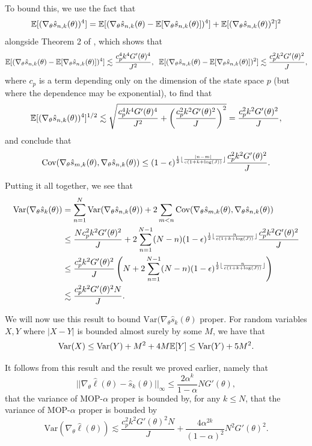 \documentclass{article}
\begin{document}
To bound this, we use the fact that $$\mathbb{E}[(\nabla_\theta\hat s_{n,k}(\theta))^4] = \mathbb{E}[(\nabla_\theta\hat s_{n,k}(\theta)-\mathbb{E}[\nabla_\theta\hat s_{n,k}(\theta)])^4]+\mathbb{E}[(\nabla_\theta\hat s_{n,k}(\theta))^2]^2$$
alongside Theorem 2 of \cite{delMoral03}, which shows that
$$\mathbb{E}[(\nabla_\theta\hat s_{n,k}(\theta)-\mathbb{E}[\nabla_\theta\hat s_{n,k}(\theta)])^4] \lesssim \frac{c_p^4k^4G'(\theta)^4}{J^2}, \;\; \mathbb{E}[(\nabla_\theta\hat s_{n,k}(\theta)-\mathbb{E}[\nabla_\theta\hat s_{n,k}(\theta)])^2] \lesssim \frac{c_p^2k^2G'(\theta)^2}{J},$$
where $c_p$ is a term depending only on the dimension of the state space $p$ (but where the dependence may be exponential), to find that 
$$\mathbb{E}[(\nabla_\theta\hat s_{n,k}(\theta))^4]^{1/2} \lesssim  \sqrt{\frac{c_p^4k^4G'(\theta)^4}{J^2}+\left(\frac{c_p^2k^2G'(\theta)^2}{J}\right)^2} = \frac{c_p^2k^2G'(\theta)^2}{J},$$
and conclude that 
$$\text{Cov}(\nabla_\theta\hat s_{m,k}(\theta), \nabla_\theta\hat s_{n,k}(\theta)) \leq (1-\epsilon)^{\frac{1}{2}\lfloor \frac{|n-m|}{c(1+k+\log(J))} \rfloor}\frac{c_p^2k^2G'(\theta)^2}{J}.$$


Putting it all together, we see that
\begin{align*}
    \text{Var}(\nabla_\theta \hat s_{k}(\theta)) &= \sum_{n=1}^N \text{Var}(\nabla_\theta\hat s_{n,k}(\theta)) + 2\sum_{m<n} \text{Cov}(\nabla_\theta\hat s_{m,k}(\theta),\nabla_\theta\hat s_{n,k}(\theta))\\
    &\leq \frac{Nc_p^2k^2G'(\theta)^2}{J} + 2\sum_{n=1}^{N-1} (N-n)(1-\epsilon)^{\frac{1}{2}\lfloor \frac{n}{c(1+k+\log(J))} \rfloor}\frac{c_p^2k^2G'(\theta)^2}{J} \\
    &\leq \frac{c_p^2k^2G'(\theta)^2}{J} \left(N + 2\sum_{n=1}^{N-1} (N-n) (1-\epsilon)^{\frac{1}{2}\lfloor \frac{n}{c(1+k+\log(J))} \rfloor}\right) \\
    &\lesssim \frac{c_p^2k^2G'(\theta)^2N}{J}.
\end{align*}

We will now use this result to bound $\text{Var}(\nabla_\theta \hat s_k(\theta)$ proper. For random variables $X,Y$ where $|X-Y|$ is bounded almost surely by some $M$, we have that 
$$\text{Var}(X) \leq \text{Var}(Y) + M^2 + 4M\mathbb{E}[Y] \leq \text{Var}(Y) + 5M^2.$$

It follows from this result and the result we proved earlier, namely that
$$||\nabla_\theta\hat\ell(\theta) - \hat s_k(\theta)||_\infty \leq \frac{2\alpha^k}{1-\alpha}NG'(\theta),$$
that the variance of MOP-$\alpha$ proper is bounded by, for any $k \leq N$,
that the variance of MOP-$\alpha$ proper is bounded by
$$\text{Var}(\nabla_\theta \hat\ell(\theta)) \lesssim \frac{c_p^2k^2G'(\theta)^2N}{J} + \frac{4\alpha^{2k}}{(1-\alpha)^2}N^2G'(\theta)^2.$$
\end{document}
